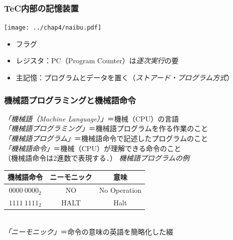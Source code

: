 \documentclass[handout]{beamer}        %
\begin{document}
\begin{frame}
  \frametitle{TeC内部の記憶装置}
  \vfill
  \centerline{\texttt{[image: ../chap4/naibu.pdf]}}
  \vfill
  \begin{itemize}
    \item フラグ
    \item レジスタ：PC（Program Counter）は\emph{逐次実行}の要
    \item 主記憶：プログラムとデータを置く（\emph{ストアード・プログラム方式}）
  \end{itemize}
  \vfill
\end{frame}

\begin{frame}
  \frametitle{機械語プログラミングと機械語命令}
  \emph{「機械語（Machine Language）」}＝機械（CPU）の言語\\
  \vfill
  \vfill
  \emph{「機械語プログラミング」}＝機械語プログラムを作る作業のこと\\
  \vfill
  \emph{「機械語プログラム」}＝機械語命令で記述したプログラムのこと\\
  \vfill
  \emph{「機械語命令」}＝機械（CPU）が理解できる命令のこと\\
  （機械語命令は2進数で表現する．）
  \vfill
  \emph{機械語プログラムの例}\\
       {\ttfamily\small\begin{center}
         \begin{tabular}{|c|c|c|} \hline
           機械語命令 & ニーモニック & 意味\\
           \hline
           $0000~0000_{2}$ & NO & No Operation \\
           $1111~1111_{2}$ & HALT & Halt \\
           \hline
         \end{tabular}\\
       \emph{「ニーモニック」}＝命令の意味の英語を簡略化した綴
       \end{center}}
\end{frame}
\end{document}
